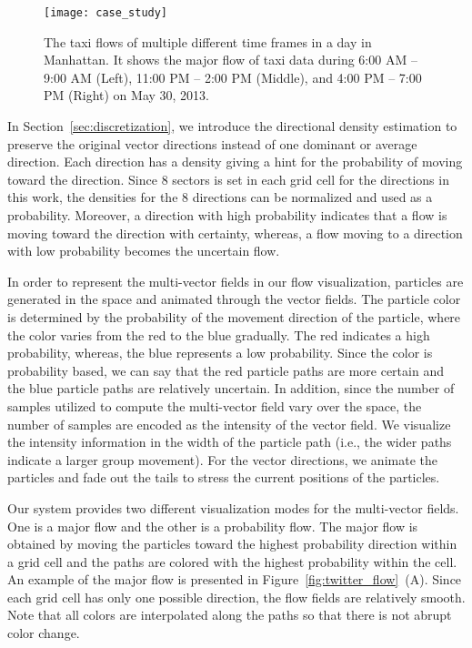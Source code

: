 \begin{figure*}[tb]
	\centering
	\texttt{[image: case\_study]}
	\caption{The taxi flows of multiple different time frames in a day in Manhattan. It shows the major flow of taxi data during 6:00 AM – 9:00 AM (Left), 11:00 PM – 2:00 PM (Middle), and 4:00 PM – 7:00 PM (Right) on May 30, 2013.}
	\label{fig:case_study_taxi}
\end{figure*} 


In Section~\ref{sec:discretization}, we introduce the directional density estimation to preserve the original vector directions instead of one dominant or average direction. Each direction has a density giving a hint for the probability of moving toward the direction. Since 8 sectors is set in each grid cell for the directions in this work, the densities for the 8 directions can be normalized and used as a probability. Moreover, a direction with high probability indicates that a flow is moving toward the direction with certainty, whereas, a flow moving to a direction with low probability becomes the uncertain flow. 

In order to represent the multi-vector fields in our flow visualization, particles are generated in the space and animated through the vector fields. The particle color is determined by the probability of the movement direction of the particle, where the color varies from the red to the blue gradually. The red indicates a high probability, whereas, the blue represents a low probability. Since the color is probability based, we can say that the red particle paths are more certain and the blue particle paths are relatively uncertain. In addition, since the number of samples utilized to compute the multi-vector field vary over the space, the number of samples are encoded as the intensity of the vector field. We visualize the intensity information in the width of the particle path (i.e., the wider paths indicate a larger group movement). For the vector directions, we animate the particles and fade out the tails to stress the current positions of the particles. 

Our system provides two different visualization modes for the multi-vector fields. One is a major flow and the other is a probability flow. The major flow is obtained by moving the particles toward the highest probability direction within a grid cell and the paths are colored with the highest probability within the cell. An example of the major flow is presented in Figure~\ref{fig:twitter_flow}~(A). Since each grid cell has only one possible direction, the flow fields are relatively smooth. Note that all colors are interpolated along the paths so that there is not abrupt color change. 

